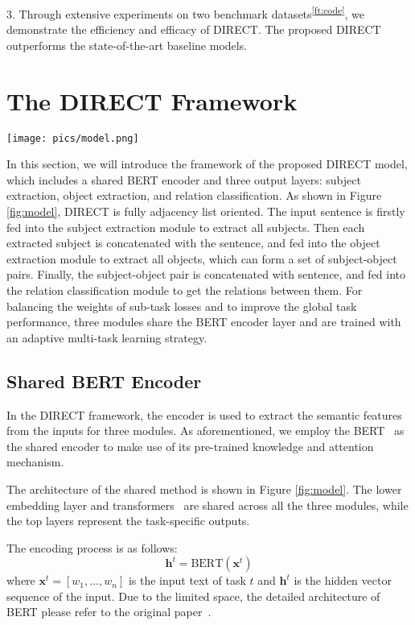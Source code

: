 \documentclass[11pt,a4paper]{article}
\begin{document}
3. Through extensive experiments on two benchmark datasets\textsuperscript{\ref{ft:code}}, we demonstrate the efficiency and efficacy of DIRECT. The proposed DIRECT outperforms the state-of-the-art baseline models. \section{The DIRECT Framework}\label{sec:method}



\begin{figure*}[ht]
\centering
\texttt{[image: pics/model.png]}
\caption{An overview of the proposed DIRECT framework}
\label{fig:model}
\end{figure*}
In this section, we will introduce the framework of the proposed DIRECT model, which includes a shared BERT encoder and three output layers: subject extraction, object extraction, and relation classification. As shown in Figure \ref{fig:model}, DIRECT is fully adjacency list oriented. The input sentence is firstly fed into the subject extraction module to extract all subjects. Then each extracted subject is concatenated with the sentence, and fed into the object extraction module to extract all objects, which can form a set of subject-object pairs. Finally, the subject-object pair is concatenated with sentence, and fed into the relation classification module to get the relations between them. For balancing the weights of sub-task losses and to improve the global task performance, three modules share the BERT encoder layer and are trained with an adaptive multi-task learning strategy. 


\subsection{Shared BERT Encoder}
In the DIRECT framework, the encoder is used to extract the semantic features from the inputs for three modules. As aforementioned, we employ the BERT~\cite{devlin2019bert} as the shared encoder to make use of its pre-trained knowledge and attention mechanism. 

The architecture of the shared method is shown in Figure \ref{fig:model}. The lower embedding layer and transformers~\cite{vaswani2017attention} are shared across all the three modules, while the top layers represent the task-speciﬁc outputs.

The encoding process is as follows:
\begin{equation}
    \mathbf{h}^t = \text{BERT}(\mathbf{x}^t)
\end{equation}
where $\mathbf{x}^t = [w_1, ..., w_n]$ is the input text of task $t$ and $\mathbf{h}^t$ is the hidden vector sequence of the input. Due to the limited space, the detailed architecture of BERT please refer to the original paper~\cite{devlin2019bert}.
\end{document}
